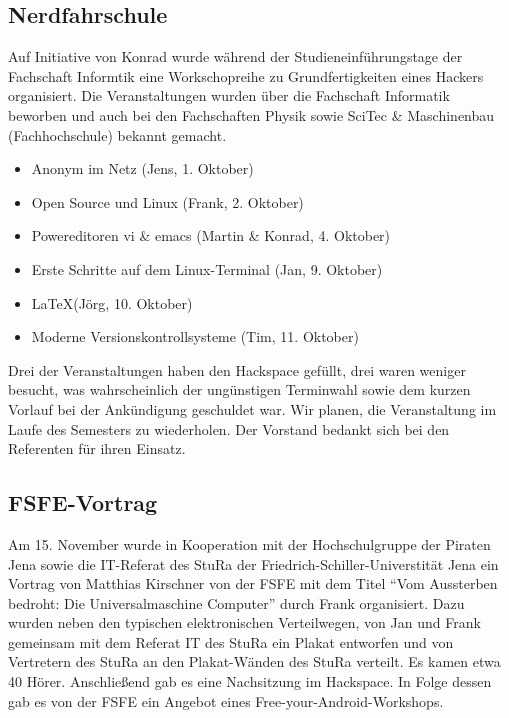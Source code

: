 \documentclass[10pt,DIV16]{scrartcl}
\begin{document}
\subsection{Nerdfahrschule}

Auf Initiative von Konrad wurde während der Studieneinführungstage der
Fachschaft Informtik eine Workschopreihe zu Grundfertigkeiten eines Hackers
organisiert.  Die Veranstaltungen wurden über die Fachschaft Informatik
beworben und auch bei den Fachschaften Physik sowie SciTec \& Maschinenbau
(Fachhochschule) bekannt gemacht.

\begin{itemize}
	\item Anonym im Netz (Jens, 1. Oktober)
	\item Open Source und Linux (Frank, 2. Oktober)
	\item Powereditoren vi \& emacs (Martin \& Konrad, 4. Oktober)
	\item Erste Schritte auf dem Linux-Terminal (Jan, 9. Oktober)
	\item \LaTeX (Jörg, 10. Oktober)
	\item Moderne Versionskontrollsysteme (Tim, 11. Oktober)
\end{itemize}

Drei der Veranstaltungen haben den Hackspace gefüllt, drei waren weniger
besucht, was wahrscheinlich der ungünstigen Terminwahl sowie dem kurzen
Vorlauf bei der Ankündigung geschuldet war.  Wir planen, die Veranstaltung im
Laufe des Semesters zu wiederholen.  Der Vorstand bedankt sich bei den
Referenten für ihren Einsatz.

\subsection{FSFE-Vortrag}

Am 15. November wurde in Kooperation mit der Hochschulgruppe der 
Piraten Jena sowie die IT-Referat des StuRa der 
Friedrich-Schiller-Universtität Jena ein Vortrag von Matthias 
Kirschner von der FSFE mit dem Titel "`Vom Aussterben bedroht: Die 
Universalmaschine Computer"' durch Frank organisiert.  Dazu wurden 
neben den typischen elektronischen Verteilwegen, von Jan und Frank 
gemeinsam mit dem Referat IT des StuRa ein Plakat entworfen und von 
Vertretern des StuRa an den Plakat-Wänden des StuRa verteilt. Es 
kamen etwa 40 Hörer. Anschließend gab es eine Nachsitzung im 
Hackspace. In Folge dessen gab es von der FSFE ein Angebot eines 
\frqq{}Free-your-Android\flqq{}-Workshops.
\end{document}
